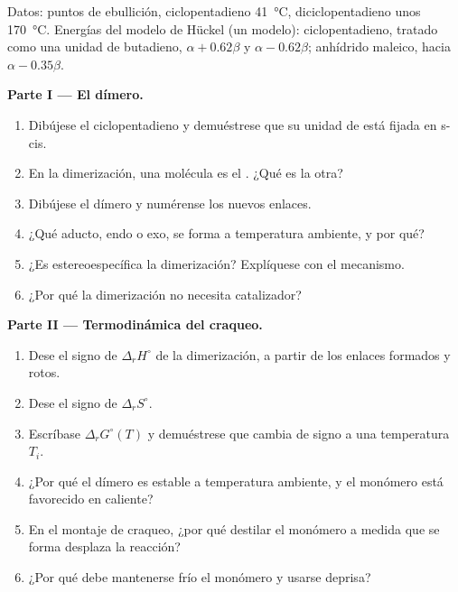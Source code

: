 \begin{problem}
\label{pb:b2:frontier-orbitals:1}
Datos: puntos de ebullición, ciclopentadieno \qty{41}{\degreeCelsius}, diciclopentadieno unos
\qty{170}{\degreeCelsius}. Energías del modelo de Hückel (un modelo): ciclopentadieno, tratado como
una unidad de butadieno,  $\alpha + 0.62\beta$ y  $\alpha - 0.62\beta$; anhídrido maleico, 
hacia $\alpha - 0.35\beta$.

\medskip
\noindent\textbf{Parte I --- El dímero.}
\begin{enumerate}
  \item Dibújese el ciclopentadieno y demuéstrese que su unidad de  está fijada en s-cis.
  \item En la dimerización, una molécula es el . ¿Qué es la otra?
  \item Dibújese el dímero y numérense los nuevos enlaces.
  \item ¿Qué aducto, endo o exo, se forma a temperatura ambiente, y por qué?
  \item ¿Es estereoespecífica la dimerización? Explíquese con el mecanismo.
  \item ¿Por qué la dimerización no necesita catalizador?
\end{enumerate}

\medskip
\noindent\textbf{Parte II --- Termodinámica del craqueo.}
\begin{enumerate}[resume]
  \item Dese el signo de $\Delta_r H^\circ$ de la dimerización, a partir de los enlaces formados y
        rotos.
  \item Dese el signo de $\Delta_r S^\circ$.
  \item Escríbase $\Delta_r G^\circ(T)$ y demuéstrese que cambia de signo a una temperatura $T_i$.
  \item ¿Por qué el dímero es estable a temperatura ambiente, y el monómero está favorecido en caliente?
  \item En el montaje de craqueo, ¿por qué destilar el monómero a medida que se forma desplaza la
        reacción?
  \item ¿Por qué debe mantenerse frío el monómero y usarse deprisa?
\end{enumerate}


\end{problem}
